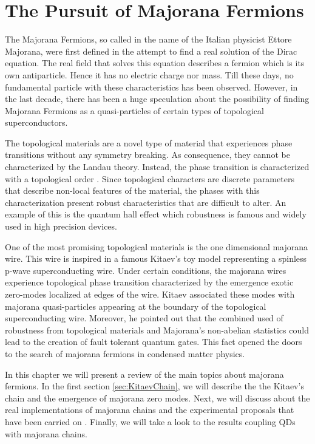 \chapter{The Pursuit of Majorana Fermions \label{chap:Majorana}}

The  Majorana Fermions, so called in the name of the Italian physicist Ettore Majorana, were first defined in the attempt to find a real solution of the Dirac equation. The real field that solves this equation describes a fermion which is its own antiparticle. Hence it has no electric charge  nor mass.  Till these days, no fundamental particle with these characteristics has been observed. However, in the last decade, there has been a huge speculation about the possibility of finding Majorana Fermions as a quasi-particles of certain types of topological superconductors.

The topological materials are a novel type of material that experiences phase transitions without any symmetry breaking. As consequence, they cannot be characterized by the Landau theory. Instead, the phase transition is characterized with a topological order . Since topological characters are discrete parameters that describe non-local features of the material, the phases with this characterization present robust characteristics that are difficult to alter. An example of this is the quantum hall effect which robustness is famous and widely used in high precision devices. 

One of the most promising topological materials is the one dimensional majorana wire. This wire is inspired in a famous Kitaev's toy model representing a spinless p-wave superconducting wire. Under certain conditions, the majorana wires experience topological phase transition characterized by the emergence exotic zero-modes localized at edges of the wire. Kitaev associated these modes with majorana quasi-particles  appearing at the boundary of the topological superconducting wire. Moreover, he pointed out that the combined used of robustness from topological materials and Majorana's non-abelian statistics could lead to the creation of fault tolerant quantum gates. This fact opened the doors to the search of majorana fermions in condensed matter physics. 

In this chapter we will present a review of the main topics about majorana fermions. In the first section \ref{sec:KitaevChain}, we will describe the the Kitaev's chain and the emergence of majorana zero modes. Next, we will discuss about the real implementations of majorana chains and the experimental proposals that have been carried on . Finally, we will take a look to the results coupling QDs with majorana chains.


